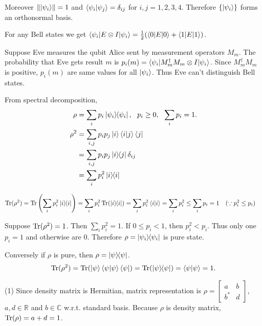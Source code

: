 Moreover $\left\lVert\ket{\psi_i}\right\rVert = 1$ and $\braket{\psi_i | \psi_j} = \delta_{ij}$ for $i,j = 1, 2, 3, 4$.
Therefore $\{\ket{\psi_i}\}$ forms an orthonormal basis.





For any Bell states we get $\braket{\psi_i | E \otimes I | \psi_i} = \frac{1}{2} (\braket{0|E|0} + \braket{1|E|1})$.

Suppose Eve measures the qubit Alice sent by measurement operators $M_m$.
The probability that Eve gets result $m$ is $p_i(m) = \braket{\psi_i | M_m^\dagger M_m \otimes I | \psi_i}$.
Since $M ^\dagger_m M_m$ is positive, $p_i(m)$ are same values for all $\ket{\psi_i}$.
Thus Eve can't distinguish Bell states.





From spectral decomposition,
\begin{align*}
    \rho &= \sum_i p_i \ket{\psi_i}\hspace{-1mm} \bra{\psi_i}, ~~ p_i \geq 0, ~~ \sum_i p_i = 1.\\
    \rho^2 &= \sum_{i,j} p_i p_j \ket{i}\braket{i|j}\bra{j}\\
        &= \sum_{i,j} p_i p_j \ket{i}\hspace{-1mm} \bra{j}\delta_{ij}\\
        &= \sum_i p_i^2 \ket{i}\hspace{-1mm} \bra{i}
\end{align*}

\begin{align*}
    \operatorname{Tr} (\rho^2) &= \operatorname{Tr} \left(\sum_i p_i^2 \ket{i}\hspace{-1mm} \bra{i}\right)
        = \sum_i p_i^2 \operatorname{Tr}(\ket{i}\hspace{-1mm} \bra{i})
        = \sum_i p_i^2 \braket{i|i}
        = \sum_i p_i^2
        \leq \sum_i p_i = 1~~~ (\because p_i^2 \leq p_i)
\end{align*}

Suppose $\operatorname{Tr} (\rho^2) = 1$. Then $\sum_i p_i^2 = 1$.
If $0 \leq p_i < 1$, then $p_i^2 < p_i$.
Thus only one $p_i = 1$ and otherwise are $0$.
Therefore $\rho = \ket{\psi_i}\hspace{-1mm} \bra{\psi_i}$ is pure state.

Conversely if $\rho$ is pure, then $\rho = \ket{\psi}\hspace{-1mm} \bra{\psi}$.
\begin{align*}
    \operatorname{Tr} (\rho^2) = \operatorname{Tr} (\ket{\psi}\braket{\psi | \psi} \bra{\psi}) = \operatorname{Tr} (\ket{\psi}\hspace{-1mm} \bra{\psi}) = \braket{\psi | \psi} = 1.
\end{align*}




(1) Since density matrix is Hermitian, matrix representation is
$\rho = \begin{bmatrix}
    a & b \\ b^* & d
\end{bmatrix}$,
$a, d \in \mathds{R}$ and $b \in \mathds{C}$ w.r.t. standard basis.
Because $\rho$ is density matrix, $\operatorname{Tr} (\rho) = a+d = 1$.

